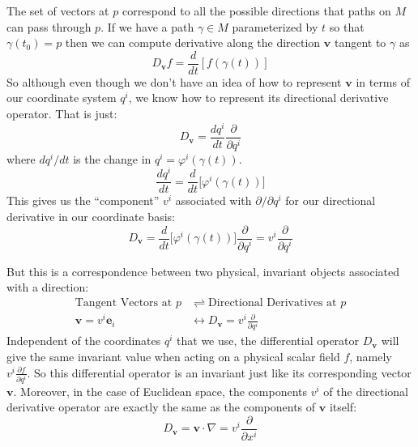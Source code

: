 	 The set of vectors at $p$ correspond to all the possible directions that paths on $M$ can pass through $p$. If we have a path $\gamma \in M$ parameterized by $t$ so that $\gamma(t_0) = p$ then we can compute derivative along the direction $\mathbf v$ tangent to $\gamma$ as
	 \begin{equation}
	 	D_\mathbf v f = \frac{d}{dt} \left[ f\left(\gamma(t) \right) \right]
	 \end{equation}
	 So although even though we don't have an idea of how to represent $\mathbf v$ in terms of our coordinate system $q^i$, we know how to represent its directional derivative operator. That is just:
	 \begin{equation}
		D_\mathbf v =  \frac{dq^i}{dt} \frac{\partial}{\partial q^i}
	 \end{equation}
	 where $dq^i/dt$ is the change in $q^i = \varphi^i(\gamma(t))$.
	 \begin{equation}
	 	\frac{dq^i}{dt} = \frac{d}{dt} \big[ \varphi^i(\gamma(t)) \big]
	 \end{equation}
	 This gives us the ``component'' $v^i$ associated with $\partial/\partial q^i$ for our directional derivative in our coordinate basis:
	 \begin{equation}
	 	D_\mathbf v = \frac{d}{dt} \big[ \varphi^i (\gamma(t))\big] \frac{\partial}{\partial q^i} = v^i \frac{\partial}{\partial q^i}
	 \end{equation}
	 
	But this is a correspondence between two physical, invariant objects associated with a direction:
	\begin{align*}
		\text{Tangent Vectors at $p$} &\rightleftharpoons \text{Directional Derivatives at $p$}\\
		\mathbf v = v^i \mathbf e_i &\longleftrightarrow D_\mathbf v = v^i \frac{\partial}{\partial q^i} 
	\end{align*}
	Independent of the coordinates $q^i$ that we use, the differential operator $D_{\mathbf v}$ will give the same invariant value when acting on a physical scalar field $f$, namely $v^i \frac{\partial f}{\partial q^i}$. So this differential operator is an invariant just like its corresponding vector $\mathbf v$. Moreover, in the case of Euclidean space, the components $v^i$ of the directional derivative operator are exactly the same as the components of $\mathbf v$ itself:
	\begin{equation}
		D_\mathbf v = \mathbf v \cdot \nabla = v^i \frac{\partial}{\partial x^i}
	\end{equation}
	
